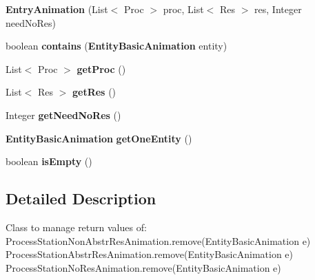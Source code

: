 \begin{DoxyCompactItemize}
\item 
{\bfseries Entry\-Animation} (List$<$ Proc $>$ proc, List$<$ Res $>$ res, Integer need\-No\-Res)\label{classdesmoj_1_1extensions_1_1visualization2d_1_1animation_1_1internal_tools_1_1_entry_animation_59d8c8a1ea4c9af1cb888cc6ea20f449_a4b4aa3316d5c5293b0d9daaa9d251a55}

\item 
boolean {\bfseries contains} ({\bf Entity\-Basic\-Animation} entity)\label{classdesmoj_1_1extensions_1_1visualization2d_1_1animation_1_1internal_tools_1_1_entry_animation_59d8c8a1ea4c9af1cb888cc6ea20f449_a0cf2d727a835d4f06602b4968f6044c0}

\item 
List$<$ Proc $>$ {\bfseries get\-Proc} ()\label{classdesmoj_1_1extensions_1_1visualization2d_1_1animation_1_1internal_tools_1_1_entry_animation_59d8c8a1ea4c9af1cb888cc6ea20f449_ab7805bcacb04a93e1e8d9383a0f77559}

\item 
List$<$ Res $>$ {\bfseries get\-Res} ()\label{classdesmoj_1_1extensions_1_1visualization2d_1_1animation_1_1internal_tools_1_1_entry_animation_59d8c8a1ea4c9af1cb888cc6ea20f449_acd9c3e28bd2fc6937d5cd63452d74294}

\item 
Integer {\bfseries get\-Need\-No\-Res} ()\label{classdesmoj_1_1extensions_1_1visualization2d_1_1animation_1_1internal_tools_1_1_entry_animation_59d8c8a1ea4c9af1cb888cc6ea20f449_aaece38d46e00029b384b96c1b6dc4235}

\item 
{\bf Entity\-Basic\-Animation} {\bfseries get\-One\-Entity} ()\label{classdesmoj_1_1extensions_1_1visualization2d_1_1animation_1_1internal_tools_1_1_entry_animation_59d8c8a1ea4c9af1cb888cc6ea20f449_a7bf6949afe635689c17a7cdd4d50c42e}

\item 
boolean {\bfseries is\-Empty} ()\label{classdesmoj_1_1extensions_1_1visualization2d_1_1animation_1_1internal_tools_1_1_entry_animation_59d8c8a1ea4c9af1cb888cc6ea20f449_a4b6c7486effb3369a98ae89d0ed6bec6}

\end{DoxyCompactItemize}


\subsection{Detailed Description}
Class to manage return values of\-: Process\-Station\-Non\-Abstr\-Res\-Animation.\-remove(\-Entity\-Basic\-Animation e) Process\-Station\-Abstr\-Res\-Animation.\-remove(\-Entity\-Basic\-Animation e) Process\-Station\-No\-Res\-Animation.\-remove(\-Entity\-Basic\-Animation e)

